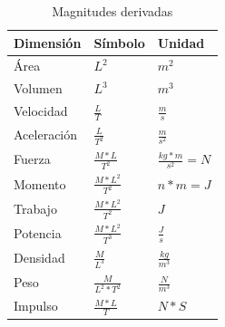 \begin{table}[t]
    \centering
    \begin{threeparttable}
    \caption{Magnitudes derivadas}
    \label{magn_der}
    {
        \begin{tabular}{|p{}|p{}|p{}|} \hline
            \bfseries{Dimensión} & \textbf{Símbolo} & \textbf{Unidad} \\ \hline
            Área & $L^2$ & $m^2$ \\ \hline
            Volumen & $L^3$ & $m^3$ \\ \hline
            Velocidad & $\frac{L}{T}$ & $\frac{m}{s}$ \\ \hline
            Aceleración & $\frac{L}{T^2}$ & $\frac{m}{s^2}$ \\ \hline
            Fuerza & $\frac{M*L}{T^2}$ & $\frac{kg*m}{s^{2}}=N$ \\ \hline
            Momento & $\frac{M*L^2}{T^2}$ & $n*m=J$ \\ \hline
            Trabajo & $\frac{M*L^2}{T^2}$ & $J$ \\ \hline
            Potencia & $\frac{M*L^2}{T^3}$ & $\frac{J}{s}$ \\ \hline
            Densidad & $\frac{M}{L^3}$ & $\frac{kg}{m^3}$ \\ \hline
            Peso & $\frac{M}{L^2*T^2}$ & $\frac{N}{m^3}$ \\ \hline
            Impulso & $\frac{M*L}{T}$ & $N*S$ \\ \hline
        \end{tabular}}
        \begin{tablenotes} %
            \item[] 
        \end{tablenotes}
    \end{threeparttable}
\end{table}